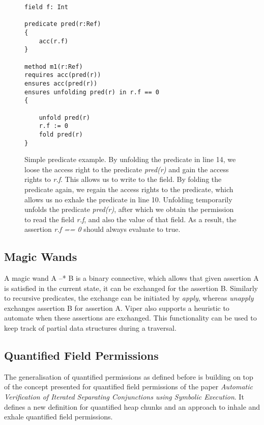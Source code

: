 \documentclass[12pt]{article}
\begin{document}
\begin{figure}[h]
  \centering
\begin{lstlisting}
field f: Int

predicate pred(r:Ref)
{
    acc(r.f)
}

method m1(r:Ref)
requires acc(pred(r))
ensures acc(pred(r))
ensures unfolding pred(r) in r.f == 0
{

    unfold pred(r)
    r.f := 0
    fold pred(r)
}
\end{lstlisting}
\caption[predicate example]
   {Simple predicate example. By unfolding the predicate in line 14, we loose the access right to the predicate \textit{pred(r)} and gain the access rights to \textit{r.f}. This allows us to write to the field. By folding the predicate again, we regain the access rights to the predicate, which allows us no exhale the predicate in line 10. Unfolding temporarily unfolds the predicate \textit{pred(r)}, after which we obtain the permission to read the field \textit{r.f}, and also the value of that field. As a result, the assertion \textit{r.f == 0} should always evaluate to true.}
\end{figure}

\subsection{Magic Wands}
A magic wand\cite{magicwand} A --* B is a binary connective, which allows that given assertion A is satisfied in the current state, it can be exchanged for the assertion B. Similarly to recursive predicates, the exchange can be initiated by \textit{apply}, whereas \textit{unapply} exchanges assertion B for assertion A. Viper also supports a heuristic to automate when these assertions are exchanged. This functionality can be used to keep track of partial data structures during a traversal.


\subsection{Quantified Field Permissions}
\label{qf}
The generalisation of quantified permissions as defined before is building on top of the concept presented for quantified field permissions of the paper \textit{Automatic Verification of Iterated Separating Conjunctions using Symbolic Execution}\cite{isc}.
It defines a new definition for quantified heap chunks and an approach to inhale and exhale quantified field permissions.
\end{document}

